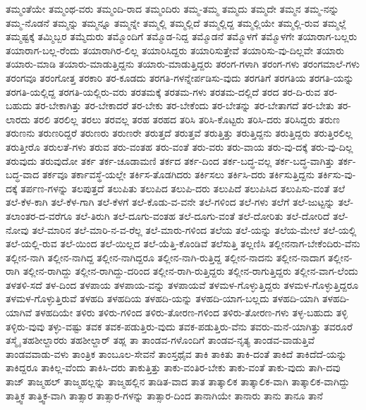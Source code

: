 {ತಮ್ಮಂತೆಯೇ
ತಮ್ಮಂಥ-ವರು
ತಮ್ಮಂದಿ-ರಾದ
ತಮ್ಮಂದಿರು
ತಮ್ಮ-ತಮ್ಮ
ತಮ್ಮದು
ತಮ್ಮದೇ
ತಮ್ಮನ
ತಮ್ಮ-ನನ್ನು
ತಮ್ಮ-ನೊಡನೆ
ತಮ್ಮನ್ನು
ತಮ್ಮನ್ನೂ
ತಮ್ಮನ್ನೇ
ತಮ್ಮಲ್ಲಿ
ತಮ್ಮಲ್ಲಿದೆ
ತಮ್ಮಲ್ಲಿದ್ದ
ತಮ್ಮಲ್ಲಿಯೇ
ತಮ್ಮಲ್ಲಿ-ರುವ
ತಮ್ಮಲ್ಲೆ
ತಮ್ಮಷ್ಟಕ್ಕೆ
ತಮ್ಮಿಬ್ಬರ
ತಮ್ಮೆದುರು
ತಮ್ಮೊಂದಿಗೆ
ತಮ್ಮೊಡ-ನಿದ್ದ
ತಮ್ಮೊಡನೆ
ತಮ್ಮೊಳಗೆ
ತಮ್ಮೊಳಗೇ
ತಯಾರಾಗ-ಬಲ್ಲರು
ತಯಾರಾಗ-ಬಲ್ಲ-ರೆಂದು
ತಯಾರಾಗಿರ-ಲಿಲ್ಲ
ತಯಾರಿಸಿದ್ದರು
ತಯಾರಿಸುತ್ತೇವೆ
ತಯಾರಿಸು-ವು-ದಿಲ್ಲವೇ
ತಯಾರು
ತಯಾರು-ಮಾಡಿ
ತಯಾರು-ಮಾಡುತ್ತಿದ್ದನು
ತಯಾರು-ಮಾಡುತ್ತಿದ್ದರು
ತರಂಗ-ಗಳಾಗಿ
ತರಂಗ-ಗಳು
ತರಂಗಮಾಲೆ-ಗಳು
ತರಂಗವೂ
ತರಂಗೋತ್ತ
ತರಕಾರಿ
ತರ-ಕೂಡದು
ತರಗತಿ-ಗಳನ್ನೇರ್ಪಡಿಸು-ವುದು
ತರಗತಿಗೆ
ತರಗತಿಯ
ತರಗತಿ-ಯನ್ನು
ತರಗತಿ-ಯಲ್ಲಿದ್ದ
ತರಗತಿ-ಯಲ್ಲಿರು-ವರು
ತರತಮಕ್ಕೆ
ತರತಮ-ಗಳು
ತರತಮ-ದಲ್ಲಿದೆ
ತರದ
ತರ-ದಿ-ರುವ
ತರ-ಬಹುದು
ತರ-ಬೇಕಾಗಿತ್ತು
ತರ-ಬೇಕಾದರೆ
ತರ-ಬೇಕು
ತರ-ಬೇಕೆಂದು
ತರ-ಬೇತನ್ನು
ತರ-ಬೇತಾಗದೆ
ತರ-ಬೇತು
ತರ-ಲಾರದು
ತರಲಿ
ತರಲಿಲ್ಲ
ತರಲು
ತರವಲ್ಲ
ತರಹ
ತರಹದ
ತರಿಸಿ
ತರಿಸಿ-ಕೊಟ್ಟರು
ತರಿಸಿ-ದರು
ತರಿಸಿದ್ದರು
ತರುಣ
ತರುಣನು
ತರುಣರಿದ್ದರೆ
ತರುಣರು
ತರುಣರೇ
ತರುತ್ತದೆ
ತರುತ್ತವೆ
ತರುತ್ತಿತ್ತು
ತರುತ್ತಿದ್ದನು
ತರುತ್ತಿದ್ದರು
ತರುತ್ತಿರಲಿಲ್ಲ
ತರುತ್ತೀರೊ
ತರುಲತೆ-ಗಳು
ತರುವ
ತರು-ವಂತಹ
ತರು-ವಂತೆ
ತರು-ವರು
ತರು-ವಾಯ
ತರು-ವು-ದಕ್ಕೆ
ತರು-ವು-ದಿಲ್ಲ
ತರುವುದು
ತರುವುದೋ
ತರ್ಕ
ತರ್ಕ-ಚೂಡಾಮಣಿ
ತರ್ಕದ
ತರ್ಕ-ದಿಂದ
ತರ್ಕ-ಬದ್ಧ-ವಲ್ಲ
ತರ್ಕ-ಬದ್ಧ-ವಾಗಿತ್ತು
ತರ್ಕ-ಬದ್ಧ-ವಾದ
ತರ್ಕವೂ
ತರ್ಕಾವಸ್ಥೆ-ಯಲ್ಲೇ
ತರ್ಕಿಸ-ತೊಡಗಿದರು
ತರ್ಕಿಸಲು
ತರ್ಕಿಸಿ-ದರು
ತರ್ಕಿಸುತ್ತಿದ್ದನು
ತರ್ಕಿಸು-ವು-ದಕ್ಕೆ
ತರ್ಪಣ-ಗಳನ್ನು
ತಲಪುತ್ತದೆ
ತಲುಪಿತು
ತಲುಪಿದ
ತಲುಪಿ-ದರು
ತಲುಪಿದೆ
ತಲುಪಿಸಿದ
ತಲುಪಿಸು-ವಂತೆ
ತಲೆ
ತಲೆ-ಕೆಳ-ಕಾಗಿ
ತಲೆ-ಕೆಳ-ಗಾಗಿ
ತಲೆ-ಕೆಳಗೆ
ತಲೆ-ಕೊಡು-ವ-ವನೇ
ತಲೆ-ಗಳಿಂದ
ತಲೆ-ಗಳು
ತಲೆಗೆ
ತಲೆ-ಜುಟ್ಟನ್ನು
ತಲೆ-ತಲಾಂತರ-ದ-ವರೆಗೂ
ತಲೆ-ತಿರುಗಿ
ತಲೆ-ದೂಗು-ವಂತಹ
ತಲೆ-ದೂಗು-ವಂತೆ
ತಲೆ-ದೋರಿತು
ತಲೆ-ದೋರಿದೆ
ತಲೆ-ನೋವು
ತಲೆ-ಮಾರಿನ
ತಲೆ-ಮಾರಿ-ನ-ವ-ರೆಲ್ಲ
ತಲೆ-ಮಾರು-ಗಳಿಂದ
ತಲೆಯ
ತಲೆ-ಯನ್ನು
ತಲೆಯ-ಮೇಲೆ
ತಲೆ-ಯಲ್ಲಿ
ತಲೆ-ಯಲ್ಲಿ-ರುವ
ತಲೆ-ಯಿಂದ
ತಲೆ-ಯಿಲ್ಲದ
ತಲೆ-ಯೆತ್ತಿ-ಕೊಂಡಿವೆ
ತಲೆಸುತ್ತಿ
ತಲ್ಲಣಿಸಿ
ತಲ್ಲೀನನಾಗ-ಬೇಕೆಂದಿರು-ವೆನು
ತಲ್ಲೀನ-ನಾಗಿ
ತಲ್ಲೀನ-ನಾಗಿದ್ದ
ತಲ್ಲೀನ-ನಾಗಿದ್ದರೂ
ತಲ್ಲೀನ-ನಾಗಿ-ರುತ್ತಿದ್ದ
ತಲ್ಲೀನ-ನಾದನು
ತಲ್ಲೀನ-ನಾದಾಗ
ತಲ್ಲೀನ-ರಾಗಿ
ತಲ್ಲೀನ-ರಾಗಿದ್ದು
ತಲ್ಲೀನ-ರಾಗಿದ್ದು-ದರಿಂದ
ತಲ್ಲೀನ-ರಾಗಿ-ರುತ್ತಿದ್ದರು
ತಲ್ಲೀನ-ರಾಗುತ್ತಿದ್ದರು
ತಲ್ಲೀನ-ವಾಗ-ಲೆಂದು
ತಳತಳಿ-ಸದೆ
ತಳ-ದಿಂದ
ತಳಪಾಯ
ತಳಪಾಯ-ವನ್ನು
ತಳಪಾಯವೆ
ತಳಮಳ-ಗೊಳ್ಳುತ್ತಿದ್ದರು
ತಳಮಳ-ಗೊಳ್ಳುತ್ತಿದ್ದರೂ
ತಳಮಳ-ಗೊಳ್ಳುತ್ತಿರುವೆ
ತಳಹದಿ
ತಳಹದಿಯ
ತಳಹದಿ-ಯನ್ನು
ತಳಹದಿ-ಯಾಗ-ಬಲ್ಲದು
ತಳಹದಿ-ಯಾಗಿ
ತಳಹದಿ-ಯಾಗಿವೆ
ತಳಹದಿಯೇ
ತಳಿರು
ತಳಿರು-ಗಳಿಂದ
ತಳಿರು-ತೋರಣ-ಗಳಿಂದ
ತಳಿರು-ತೋರಣ-ಗಳು
ತಳ್ಳ-ಬಹುದು
ತಳ್ಳಿ
ತಳ್ಳಿರು-ವುವು
ತಳ್ಳು-ವಷ್ಟು
ತವಕ
ತವಕ-ಪಡುತ್ತಿರು-ವುದು
ತವಕ-ಪಡುತ್ತಿರು-ವೆನು
ತವರು-ಮನೆ-ಯಾಗಿತ್ತು
ತವರೂರೆ
ತಸ್ಮೈ
ತಹಶೀಲ್ದಾರರು
ತಹಶೀಲ್ದಾರ್
ತಹ್ಲ
ತಾ
ತಾಂಡವ-ಗಳೊಂದಿಗೆ
ತಾಂಡವ-ನೃತ್ಯ
ತಾಂಡವ-ವಾಡುತ್ತಿವೆ
ತಾಂಡವವಾಡು-ವಳು
ತಾಂತ್ರಿಕ
ತಾಂಬೂಲ-ಸೇವನೆ
ತಾಂಸ್ತಥೈವ
ತಾಕಿ
ತಾಕಿತು
ತಾಕಿ-ದಂತೆ
ತಾಕಿದೆ
ತಾಕಿದೆದೆ-ಯನ್ನು
ತಾಕಿದ್ದರೂ
ತಾಕಿಲ್ಲ-ವೆಂದು
ತಾಕಿಸಿ-ದರು
ತಾಕುತ್ತಿತ್ತು
ತಾಕು-ವಂತಿರ-ಬೇಕು
ತಾಕು-ವಂತೆ
ತಾಕು-ವುದು
ತಾಗಿ-ದವು
ತಾಜ್
ತಾಜ್ಮಹಲ್
ತಾಜ್ಮಹಲ್ಲನ್ನು
ತಾಜ್ಮಹಲ್ಲಿನ
ತಾಡಿತ-ವಾದ
ತಾತ
ತಾತ್ಕಾಲಿಕ
ತಾತ್ಕಾಲಿಕ-ವಾಗಿ
ತಾತ್ಕಾಲಿಕ-ವಾಗಿದ್ದು
ತಾತ್ತ್ವಿಕ
ತಾತ್ತ್ವಿಕ-ವಾಗಿ
ತಾತ್ಸಾರ
ತಾತ್ಸಾರ-ಗಳನ್ನು
ತಾತ್ಸಾರ-ದಿಂದ
ತಾನಾಗಿಯೇ
ತಾನಾರು
ತಾನು
ತಾನೂ
ತಾನೆ
}
